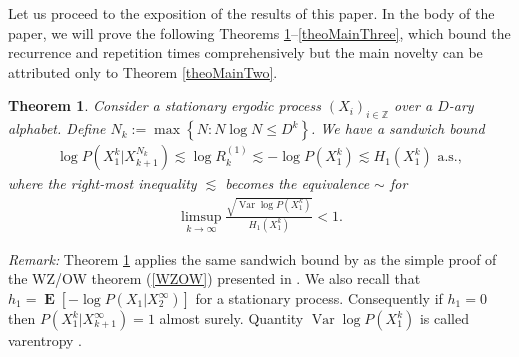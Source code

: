 \documentclass[a4paper,12pt]{article}
\newcommand{\kwad}[1]{\left[ #1 \right]}
\newcommand{\klam}[1]{\left\{ #1 \right\}}
\DeclareMathOperator{\var}{Var}
\DeclareMathOperator{\mean}{\mathbf{E}}
\newtheorem{theorem}{Theorem}
\begin{document}
Let us proceed to the exposition of the results of this paper.  In the
body of the paper, we will prove the following Theorems
\ref{theoMainOne}--\ref{theoMainThree}, which bound the recurrence and
repetition times comprehensively but the main novelty can be
attributed only to Theorem \ref{theoMainTwo}.
\begin{theorem}
  \label{theoMainOne}
  Consider a stationary ergodic process $(X_i)_{i\in\mathbb{Z}}$ over
  a $D$-ary alphabet. Define $N_k:=\max\klam{N: N\log N\le D^k}$. We
  have a sandwich bound
  \begin{align}
    \log P(X_1^k|X_{k+1}^{N_k})\lesssim
    \log R^{(1)}_k\lesssim
    -\log P(X_1^k)\lesssim
    H_1(X_1^k)
    \text{ a.s.},
  \end{align}
  where the right-most inequality $\lesssim$ becomes the equivalence
  $\sim$ for
  \begin{align}
    \limsup_{k\to\infty} \frac{\sqrt{\var\log P(X_1^k)}}{H_1(X_1^k)}<1.
  \end{align}
\end{theorem}
\emph{Remark:} Theorem \ref{theoMainOne} applies the same sandwich
bound by \citet{Kontoyiannis98} as the simple proof of the WZ/OW
theorem (\ref{WZOW}) presented in \citep[Theorem 9.12]{Debowski21}.
We also recall that $h_1=\mean\kwad{-\log P(X_1|X_2^\infty)}$ for a
stationary process. Consequently if $h_1=0$ then
$P(X_1^k|X_{k+1}^\infty)=1$ almost surely. Quantity
$\var\log P(X_1^k)$ is called varentropy \citep{KontoyiannisVerdu13}.
\end{document}
